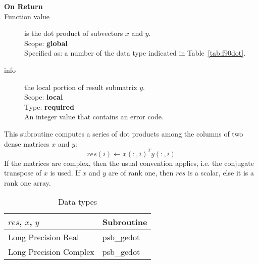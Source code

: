 \begin{description}
\item[\bf On Return] 
\item[Function value] is the dot product of subvectors $x$ and $y$.\\
Scope: {\bf global} \\
Specified as: a number of the data type indicated in Table~\ref{tab:f90dot}.
\item[info] the local portion of result submatrix $y$.\\
Scope: {\bf local} \\
Type: {\bf required} \\
An integer value that contains an error code. 
\end{description}
%
%


This subroutine computes a series of  dot products among the columns of
two dense matrices  $x$ and $y$: 
\[ res(i) \leftarrow x(:,i)^T y(:,i)\]
If the matrices are complex, then the
usual convention applies, i.e. the conjugate transpose of $x$ is
used. If $x$ and $y$ are of rank one, then $res$ is a scalar, else it
is a rank one array. 

\begin{table}[h]
\begin{center}
\begin{tabular}{ll}
\hline
$res$, $x$, $y$ & {\bf Subroutine}\\
\hline
Long Precision Real & psb\_gedot \\
Long Precision Complex & psb\_gedot \\	
\hline
\end{tabular}
\end{center}
\caption{Data types\label{tab:f90mdot}}
\end{table}

